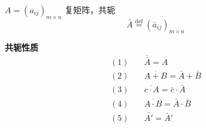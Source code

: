 

\begin{definition}%
$A=(a_{ij})_{m\times n}$ 复矩阵，共轭
\[
\bar A\overset{\mathrm{def}}{=}(\bar a_{ij})_{m\times n}
\]
\end{definition}

\noindent\textbf{共轭性质}
\begin{align*}
(1)&\quad \overline{\bar A}=A\\
(2)&\quad \overline{A+B}=\bar A+\bar B\\
(3)&\quad \overline{c\cdot A}=\bar c\cdot\bar A\\
(4)&\quad \overline{A\cdot B}=\bar A\cdot\bar B\\
(5)&\quad \overline{A'}=\bar A'%
\end{align*}

